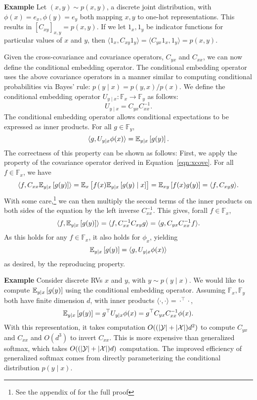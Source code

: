 \documentclass{article}
\begin{document}
\textbf{Example}
Let $(x,y)\sim p(x,y)$, a discrete joint distribution,
with $\phi(x)=e_x,\phi(y)=e_y$ both mapping $x,y$ to one-hot representations.
This results in $[C_{xy}]_{x,y}=p(x,y)$.
If we let $1_x,1_y$ be indicator functions for particular values of $x$ and $y$,
then $\langle 1_x, C_{xy}1_y\rangle = \langle C_{yx}1_x, 1_y\rangle= p(x,y)$.

Given the cross-covariance and covariance operators, $C_{yx}$ and $C_{xx}$,
we can now define the conditional embedding operator.
The conditional embedding operator uses the above covariance operators in a manner
similar to computing conditional probabilities via Bayes' rule: $p(y\mid x) = p(y,x)/p(x)$.
We define the conditional embedding operator $U_{y\mid x}: \mathbb{F}_x\to\mathbb{F}_y$
as follows:
\begin{equation}
    \label{eqn:conditional-mean}
    U_{y\mid x} = C_{yx}C_{xx}^{-1}.
\end{equation}
The conditional embedding operator allows conditional expectations to be
expressed as inner products.
For all $g \in \mathbb{F}_y$,
\begin{equation}
\label{eqn:conditional-expectation}
\langle g, U_{y\mid x}\phi(x) \rangle = \mathbb{E}_{y\mid x}\left[g(y)\right].
\end{equation}
The correctness of this property can be shown as follows:
First, we apply the property of the covariance operator derived in
Equation~\ref{eqn:xcove}. For all $f\in\mathbb{F}_x$, we have
\begin{equation}
\label{eqn:prf-conditional-expectation}
    \langle f, C_{xx}\mathbb{E}_{y\mid x}\left[g(y)\right]\rangle
    = \mathbb{E}_{x}\left[f(x)\mathbb{E}_{y\mid x}\left[g(y)\mid x\right]\right]
    = \mathbb{E}_{xy}\left[f(x)g(y)\right]
    = \langle f, C_{xy}g\rangle.
\end{equation}
With some care,\footnote{
See the appendix of \citet{fukumizu2004kernel} for the full proof}
we can then multiply the second terms of the inner products on both sides
of the equation by the left inverse $C_{xx}^{-1}$.
This gives, forall $f\in\mathbb{F}_x$,
$$\langle f, \mathbb{E}_{y\mid x}\left[g(y)\right]\rangle = \langle f, C_{xx}^{-1}C_{xy}g \rangle
= \langle g, C_{yx}C_{xx}^{-1}f\rangle.$$
As this holds for any $f\in\mathbb{F}_x$, it also holds for $\phi_x$,
yielding
$$
\mathbb{E}_{y\mid x}\left[g(y)\right] = \langle g, U_{y\mid x}\phi(x)\rangle
$$
as desired, by the reproducing property.

\textbf{Example}
Consider discrete RVs $x$ and $y$, with $y\sim p(y\mid x)$.
We would like to compute $\mathbb{E}_{y\mid x}\left[g(y)\right]$ using the conditional embedding operator.
Assuming $\mathbb{F}_x,\mathbb{F}_y$ both have finite dimension $d$,
with inner products $\langle\cdot,\cdot\rangle=\cdot^\top\cdot$,
$$\mathbb{E}_{y\mid x}\left[g(y)\right] = g^\top U_{y\mid x}\phi(x) = g^\top C_{yx}C_{xx}^{-1}\phi(x).$$
With this representation, it takes computation $O((|\mathcal{Y}|+|\mathcal{X}|)d^2)$
to compute $C_{yx}$ and $C_{xx}$ and $O(d^3)$ to invert $C_{xx}$.
This is more expensive than generalized softmax,
which takes $O((|\mathcal{Y}|+|\mathcal{X}|)d)$ computation.
The improved efficiency of generalized softmax comes from directly parameterizing
the conditional distribution $p(y\mid x)$.
\end{document}
